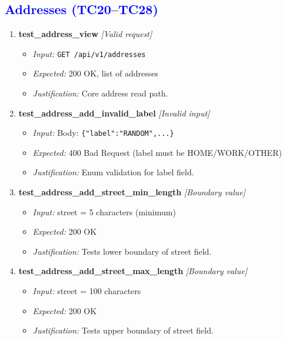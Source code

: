 \documentclass{article}
\begin{document}
\subsection*{\textcolor{blue}{Addresses (TC20--TC28)}}
\begin{enumerate}[resume, label=\textbf{TC\arabic*.}]

\item \textbf{test\_address\_view} \textit{[Valid request]}
\begin{itemize}[noitemsep]
  \item \textit{Input:} \texttt{GET /api/v1/addresses}
  \item \textit{Expected:} 200 OK, list of addresses
  \item \textit{Justification:} Core address read path.
\end{itemize}

\item \textbf{test\_address\_add\_invalid\_label} \textit{[Invalid input]}
\begin{itemize}[noitemsep]
  \item \textit{Input:} Body: \texttt{\{"label":"RANDOM",...\}}
  \item \textit{Expected:} 400 Bad Request (label must be HOME/WORK/OTHER)
  \item \textit{Justification:} Enum validation for label field.
\end{itemize}

\item \textbf{test\_address\_add\_street\_min\_length} \textit{[Boundary value]}
\begin{itemize}[noitemsep]
  \item \textit{Input:} street = 5 characters (minimum)
  \item \textit{Expected:} 200 OK
  \item \textit{Justification:} Tests lower boundary of street field.
\end{itemize}

\item \textbf{test\_address\_add\_street\_max\_length} \textit{[Boundary value]}
\begin{itemize}[noitemsep]
  \item \textit{Input:} street = 100 characters
  \item \textit{Expected:} 200 OK
  \item \textit{Justification:} Tests upper boundary of street field.
\end{itemize}


\end{enumerate}
\end{document}
